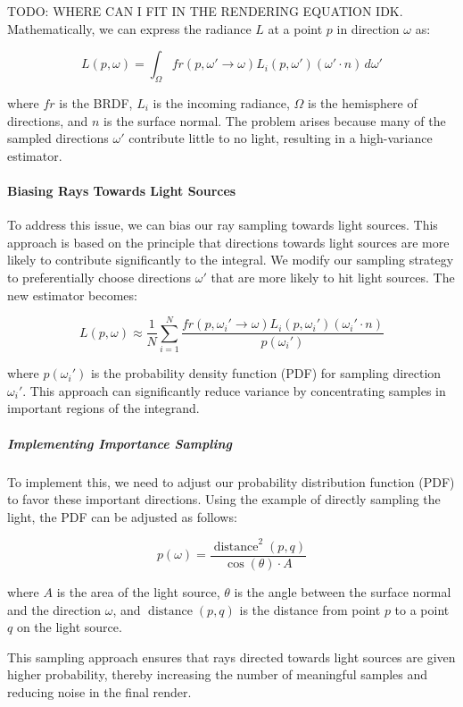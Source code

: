 \documentclass[12pt]{article}
\begin{document}
TODO: WHERE CAN I FIT IN THE RENDERING EQUATION IDK.
Mathematically, we can express the radiance \( L \) at a point \( p \) in direction \( \omega \) as:

\[
    L(p, \omega) = \int_{\Omega} fr(p, \omega' \to \omega) L_i(p, \omega') (\omega' \cdot n) \, d\omega'
\]

where \( fr \) is the BRDF, \( L_i \) is the incoming radiance, \( \Omega \) is the hemisphere of directions, and \( n \) is the surface normal. The problem arises because many of the sampled directions \( \omega' \) contribute little to no light, resulting in a high-variance estimator.

\paragraph{Biasing Rays Towards Light Sources}

To address this issue, we can bias our ray sampling towards light sources. This approach is based on the principle that directions towards light sources are more likely to contribute significantly to the integral. We modify our sampling strategy to preferentially choose directions \( \omega' \) that are more likely to hit light sources. The new estimator becomes:

\[
    L(p, \omega) \approx \frac{1}{N} \sum_{i=1}^N \frac{fr(p, \omega_i' \to \omega) L_i(p, \omega_i') (\omega_i' \cdot n)}{p(\omega_i')}
\]

where \( p(\omega_i') \) is the probability density function (PDF) for sampling direction \( \omega_i' \). This approach can significantly reduce variance by concentrating samples in important regions of the integrand.

\subparagraph{Implementing Importance Sampling}
To implement this, we need to adjust our probability distribution function (PDF) to favor these important directions. Using the example of directly sampling the light, the PDF can be adjusted as follows:

\[
    p(\omega) = \frac{\operatorname{distance}^2(p,q)}{\cos(\theta) \cdot A}
\]

where \( A \) is the area of the light source, \( \theta \) is the angle between the surface normal and the direction \( \omega \), and \(\operatorname{distance}(p,q)\) is the distance from point \( p \) to a point \( q \) on the light source.

This sampling approach ensures that rays directed towards light sources are given higher probability, thereby increasing the number of meaningful samples and reducing noise in the final render.
\end{document}
